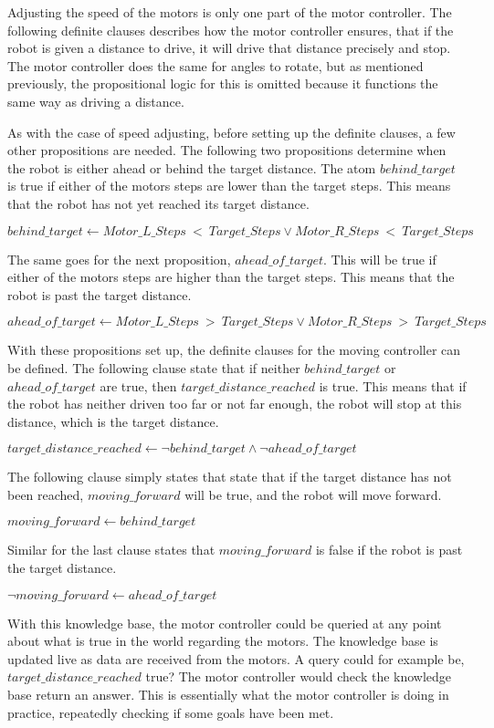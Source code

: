 Adjusting the speed of the motors is only one part of the motor controller. The following definite clauses describes how the motor controller ensures, that if the robot is given a distance to drive, it will drive that distance precisely and stop. The motor controller does the same for angles to rotate, but as mentioned previously, the propositional logic for this is omitted because it functions the same way as driving a distance.

As with the case of speed adjusting, before setting up the definite clauses, a few other propositions are needed. The following two propositions determine when the robot is either ahead or behind the target distance. The atom $behind\_target$ is true if either of the motors steps are lower than the target steps. This means that the robot has not yet reached its target distance.

\hspace{3mm} $behind\_target \leftarrow Motor\_L\_Steps~<~Target\_Steps \lor Motor\_R\_Steps~<~Target\_Steps$

The same goes for the next proposition, $ahead\_of\_target$. This will be true if either of the motors steps are higher than the target steps. This means that the robot is past the target distance.

\hspace{3mm} $ahead\_of\_target \leftarrow Motor\_L\_Steps~>~Target\_Steps \lor Motor\_R\_Steps~>~Target\_Steps$

With these propositions set up, the definite clauses for the moving controller can be defined. The following clause state that if neither $behind\_target$ or $ahead\_of\_target$ are true, then $target\_distance\_reached$ is true. This means that if the robot has neither driven too far or not far enough, the robot will stop at this distance, which is the target distance.

\hspace{3mm} $target\_distance\_reached \leftarrow \lnot behind\_target \land \lnot ahead\_of\_target$

The following clause simply states that state that if the target distance has not been reached, $moving\_forward$ will be true, and the robot will move forward.

\hspace{3mm} $moving\_forward \leftarrow behind\_target$

Similar for the last clause states that $moving\_forward$ is false if the robot is past the target distance.

\hspace{3mm} $\lnot moving\_forward \leftarrow ahead\_of\_target$

With this knowledge base, the motor controller could be queried at any point about what is true in the world regarding the motors. The knowledge base is updated live as data are received from the motors. A query could for example be, $target\_distance\_reached$ true? The motor controller would check the knowledge base return an answer. This is essentially what the motor controller is doing in practice, repeatedly checking if some goals have been met.

